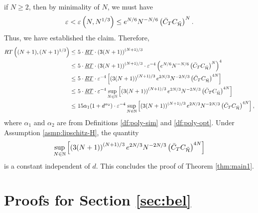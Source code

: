 \documentclass[11pt]{article}
\theoremstyle{definition}
\theoremstyle{plain}
\newcommand{\N}{\mathbb{N}}
\newcommand{\cH}{{\cal H}}
\newcommand{\veps}{\varepsilon}
\begin{document}
\begin{appendices}
  if $N \geq 2$, then by minimality of $N$, we must have 
  \[
  \veps < \veps\left(N, N^{1/3}\right) \leq e^{N/6} N^{-N/6} \left(\bar C_T C_{\tilde \cH} \right)^N.
  \]
  Thus, we have established the claim. Therefore,
  \begin{align*}
  RT\left((N+1), (N+1)^{1/3} \right) \le &~5\cdot\underline{RT}\cdot \left(3(N+1)\right)^{(N+1)/3} \\
  \le &~ 5\cdot\underline{RT} \cdot \left(3(N+1)\right)^{(N+1)/3} \cdot \veps^{-4} \left(e^{N/6} N^{-N/6} \left(\bar C_T C_{\tilde \cH} \right)^N\right)^4 \\
  \le &~ 5\cdot\underline{RT}\cdot \veps^{-4} \left[\left(3(N+1)\right)^{(N+1)/3} e^{2N/3} N^{-2N/3} \left(\bar C_T C_{\tilde \cH} \right)^{4N}\right] \\
  \le &~ 5\cdot\underline{RT} \cdot \veps^{-4} \sup_{N\in \N} \left[\left(3(N+1)\right)^{(N+1)/3} e^{2N/3} N^{-2N/3} \left(\bar C_T C_{\tilde \cH} \right)^{4N}\right] \\
  \le &~ 15\alpha_1 (1+d^{\alpha_2}) \cdot \veps^{-4} \sup_{N\in \N} \left[\left(3(N+1)\right)^{(N+1)/3} e^{2N/3} N^{-2N/3} \left(\bar C_T C_{\tilde \cH} \right)^{4N}\right],
  \end{align*}
  where $\alpha_1$ and $\alpha_2$ are from Definitions \ref{df:poly-sim} and \ref{df:poly-opt}.
  Under Assumption \ref{asmp:lipschitz-H}, the quantity 
  \begin{equation}\label{eq:C_RT}
  \sup_{N\in \N} \left[\left(3(N+1)\right)^{(N+1)/3} e^{2N/3} N^{-2N/3} \left(\bar C_T C_{\tilde \cH} \right)^{4N}\right]
  \end{equation}
  is a constant independent of $d$. This concludes the proof of Theorem \ref{thm:main1}. 
  
    

\section{Proofs for Section \ref{sec:bel}}

\end{appendices}
\end{document}
